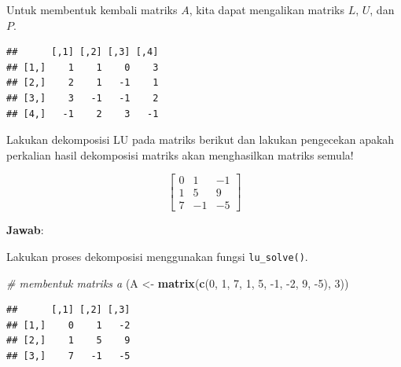 \documentclass[]{book}
\newenvironment{Shaded}{\begin{snugshade}}{\end{snugshade}}
\newcommand{\CommentTok}[1]{\textcolor[rgb]{0.56,0.35,0.01}{\textit{#1}}}
\newcommand{\DecValTok}[1]{\textcolor[rgb]{0.00,0.00,0.81}{#1}}
\newcommand{\KeywordTok}[1]{\textcolor[rgb]{0.13,0.29,0.53}{\textbf{#1}}}
\newcommand{\NormalTok}[1]{#1}
\newcommand{\OperatorTok}[1]{\textcolor[rgb]{0.81,0.36,0.00}{\textbf{#1}}}
\newcommand{\StringTok}[1]{\textcolor[rgb]{0.31,0.60,0.02}{#1}}
\theoremstyle{definition}
\theoremstyle{definition}
\theoremstyle{definition}
\theoremstyle{remark}
\let\BeginKnitrBlock\begin \let\EndKnitrBlock\end
\begin{document}
Untuk membentuk kembali matriks \(A\), kita dapat mengalikan matriks \(L\), \(U\), dan \(P\).

\begin{Shaded}
\end{Shaded}

\begin{verbatim}
##      [,1] [,2] [,3] [,4]
## [1,]    1    1    0    3
## [2,]    2    1   -1    1
## [3,]    3   -1   -1    2
## [4,]   -1    2    3   -1
\end{verbatim}

\BeginKnitrBlock{example}
\protect\hypertarget{exm:LUexmp2}{}{\label{exm:LUexmp2} }Lakukan dekomposisi LU pada matriks berikut dan lakukan pengecekan apakah perkalian hasil dekomposisi matriks akan menghasilkan matriks semula!
\EndKnitrBlock{example}

\[
\begin{bmatrix}
     0         & 1       & -1                  \\[0.3em]
     1         & 5       & 9                   \\[0.3em]
     7         & -1      & -5                  
\end{bmatrix}
\]

\textbf{Jawab}:

Lakukan proses dekomposisi menggunakan fungsi \texttt{lu\_solve()}.

\begin{Shaded}
\begin{Highlighting}[]
\CommentTok{# membentuk matriks a}
\NormalTok{(A <-}\StringTok{ }\KeywordTok{matrix}\NormalTok{(}\KeywordTok{c}\NormalTok{(}\DecValTok{0}\NormalTok{, }\DecValTok{1}\NormalTok{, }\DecValTok{7}\NormalTok{, }\DecValTok{1}\NormalTok{, }\DecValTok{5}\NormalTok{, }\DecValTok{-1}\NormalTok{, }\DecValTok{-2}\NormalTok{, }\DecValTok{9}\NormalTok{, }\DecValTok{-5}\NormalTok{), }\DecValTok{3}\NormalTok{))}
\end{Highlighting}
\end{Shaded}

\begin{verbatim}
##      [,1] [,2] [,3]
## [1,]    0    1   -2
## [2,]    1    5    9
## [3,]    7   -1   -5
\end{verbatim}
\end{document}
